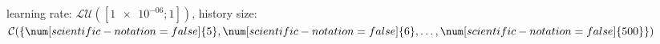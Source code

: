 learning rate: $\mathcal{LU}([\num[scientific-notation=true]{1e-06}; \num[scientific-notation=false]{1}])$, history size: $\mathcal{C}(\{\num[scientific-notation=false]{5},\num[scientific-notation=false]{6},\text{\dots},\num[scientific-notation=false]{500}\})$